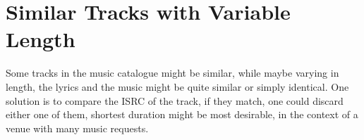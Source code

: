 \section{Similar Tracks with Variable Length}
\label{sub:duplicates}

Some tracks in the music catalogue might be similar, while maybe
varying in length, the lyrics and the music might be quite similar or simply identical. One solution is to compare the ISRC of the track, if they match, one could discard either one of them, shortest duration might be most desirable, in the context of a venue with many music requests.
